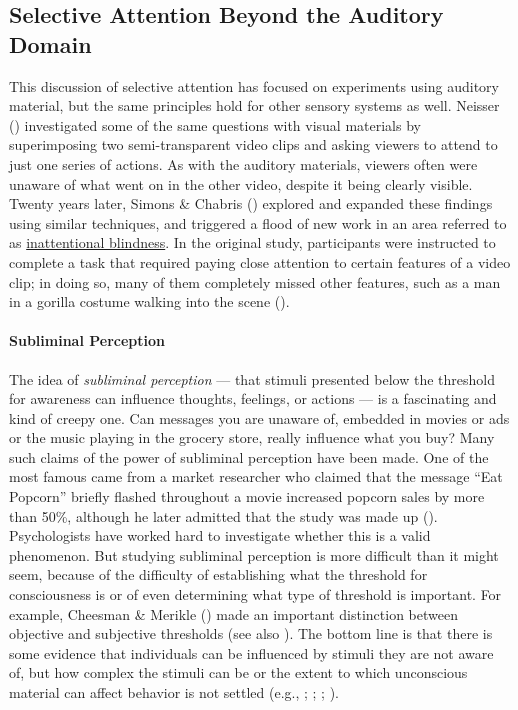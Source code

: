 \documentclass[
]{krantz}
\begin{document}
\subsection*{Selective Attention Beyond the Auditory Domain}\label{selective-attention-beyond-the-auditory-domain}


This discussion of selective attention has focused on experiments using auditory material, but the same principles hold for other sensory systems as well. Neisser () investigated some of the same questions with visual materials by superimposing two semi-transparent video clips and asking viewers to attend to just one series of actions. As with the auditory materials, viewers often were unaware of what went on in the other video, despite it being clearly visible. Twenty years later, Simons \& Chabris () explored and expanded these findings using similar techniques, and triggered a flood of new work in an area referred to as \hyperref[inattentional-blindness]{inattentional blindness}. In the original study, participants were instructed to complete a task that required paying close attention to certain features of a video clip; in doing so, many of them completely missed other features, such as a man in a gorilla costume walking into the scene ().

\paragraph*{Subliminal Perception}\label{subliminal-perception}

The idea of \emph{subliminal perception} --- that stimuli presented below the threshold for awareness can influence thoughts, feelings, or actions --- is a fascinating and kind of creepy one. Can messages you are unaware of, embedded in movies or ads or the music playing in the grocery store, really influence what you buy? Many such claims of the power of subliminal perception have been made. One of the most famous came from a market researcher who claimed that the message ``Eat Popcorn'' briefly flashed throughout a movie increased popcorn sales by more than 50\%, although he later admitted that the study was made up (). Psychologists have worked hard to investigate whether this is a valid phenomenon. But studying subliminal perception is more difficult than it might seem, because of the difficulty of establishing what the threshold for consciousness is or of even determining what type of threshold is important. For example, Cheesman \& Merikle () made an important distinction between objective and subjective thresholds (see also ). The bottom line is that there is some evidence that individuals can be influenced by stimuli they are not aware of, but how complex the stimuli can be or the extent to which unconscious material can affect behavior is not settled (e.g., ; ; ; ).
\end{document}
